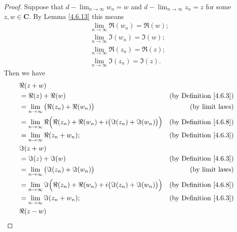 \begin{proof}
    Suppose that \(d - \lim_{n \to \infty} w_n = w\) and \(d - \lim_{n \to \infty} z_n = z\) for some \(z, w \in \mathbf{C}\).
    By Lemma \ref{4.6.13} this means
    \begin{align*}
         & \lim_{n \to \infty} \Re(w_n) = \Re(w); \\
         & \lim_{n \to \infty} \Im(w_n) = \Im(w); \\
         & \lim_{n \to \infty} \Re(z_n) = \Re(z); \\
         & \lim_{n \to \infty} \Im(z_n) = \Im(z).
    \end{align*}
    Then we have
    \begin{align*}
         & \Re(z + w)                                                                                                                    \\
         & = \Re(z) + \Re(w)                                                                        & \text{(by Definition \ref{4.6.3})} \\
         & = \lim_{n \to \infty} \big(\Re(z_n) + \Re(w_n)\big)                                      & \text{(by limit laws)}             \\
         & = \lim_{n \to \infty} \Re\Big(\Re(z_n) + \Re(w_n) + i \big(\Im(z_n) + \Im(w_n)\big)\Big) & \text{(by Definition \ref{4.6.8})} \\
         & = \lim_{n \to \infty} \Re(z_n + w_n);                                                    & \text{(by Definition \ref{4.6.3})} \\
         & \Im(z + w)                                                                                                                    \\
         & = \Im(z) + \Im(w)                                                                        & \text{(by Definition \ref{4.6.3})} \\
         & = \lim_{n \to \infty} \big(\Im(z_n) + \Im(w_n)\big)                                      & \text{(by limit laws)}             \\
         & = \lim_{n \to \infty} \Im\Big(\Re(z_n) + \Re(w_n) + i \big(\Im(z_n) + \Im(w_n)\big)\Big) & \text{(by Definition \ref{4.6.8})} \\
         & = \lim_{n \to \infty} \Im(z_n + w_n);                                                    & \text{(by Definition \ref{4.6.3})} \\
         & \Re(z - w)                                                                                                                    \\

\end{align*}
\end{proof}
